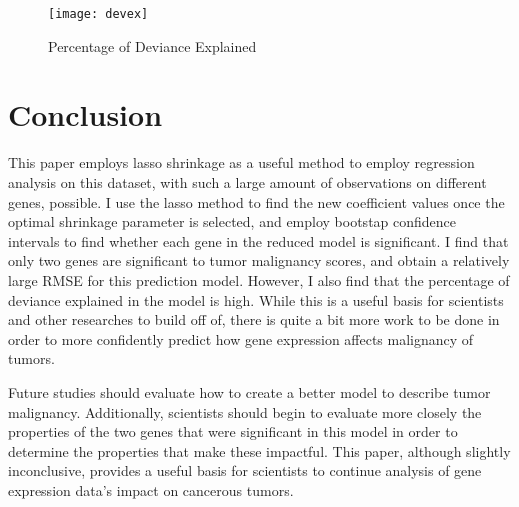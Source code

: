 \documentclass{svproc}
\begin{document}
\begin{figure}
\begin{center}
\caption{Percentage of Deviance Explained}
\texttt{[image: devex]}
\label{devex}
\smallskip
\end{center}
\end{figure}

\section{Conclusion}

This paper employs lasso shrinkage as a useful method to employ regression analysis on this dataset, with such a large amount of observations on different genes, possible. I use the lasso method to find the new coefficient values once the optimal shrinkage parameter is selected, and employ bootstap confidence intervals to find whether each gene in the reduced model is significant. I find that only two genes are significant to tumor malignancy scores, and obtain a relatively large RMSE for this prediction model. However, I also find that the percentage of deviance explained in the model is high. While this is a useful basis for scientists and other researches to build off of, there is quite a bit more work to be done in order to more confidently predict how gene expression affects malignancy of tumors.

Future studies should evaluate how to create a better model to describe tumor malignancy. Additionally, scientists should begin to evaluate more closely the properties of the two genes that were significant in this model in order to determine the properties that make these impactful. This paper, although slightly inconclusive, provides a useful basis for scientists to continue analysis of gene expression data's impact on cancerous tumors.
\end{document}
